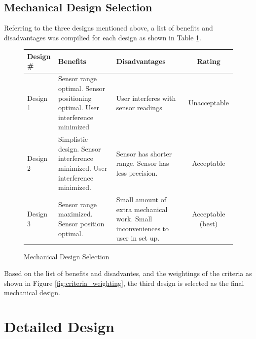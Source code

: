 \documentclass[oneside,final,a4paper]{report}
\begin{document}
\section{Mechanical Design Selection} \label{MechDesSel}
Referring to the three designs mentioned above, a list of benefits and disadvantages was compilied for each design as shown in Table \ref{tab:MechDesSel}.

\begin{figure}[ht]
\centering
\begin{tabular}{|l|p{5cm}|p{5cm}|c|}
\hline
Design \# & Benefits & Disadvantages & Rating\\
\hline \hline
Design 1 &Sensor range optimal. Sensor positioning optimal. User interference minimized & User interferes with sensor readings& Unacceptable\\
\hline
Design 2 & Simplistic design. Sensor interference minimized. User interference minimized. & Sensor has shorter range. Sensor has less precision. & Acceptable\\
\hline
Design 3 & Sensor range maximized. Sensor position optimal.&Small amount of extra mechanical work. Small inconveniences to user in set up. & Acceptable (best)\\
\hline
\end{tabular}
\caption{Mechanical Design Selection}
\label{tab:MechDesSel}
\end{figure}

Based on the list of benefits and disadvantes, and the weightings of the criteria as shown in Figure \ref{fig:criteria_weighting}, the third design is selected as the final mechanical design.

\chapter{Detailed Design}
\end{document}
